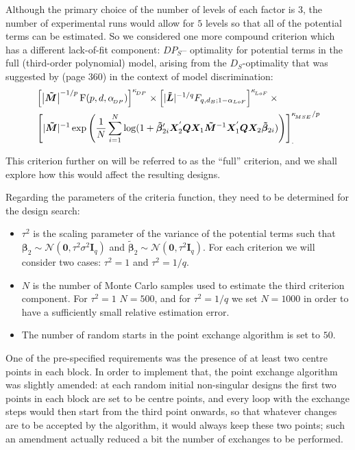 Although the primary choice of the number of levels of each factor is $3$, the number of experimental runs would allow for $5$ levels so that all of the potential terms can be estimated. So we considered one more compound criterion which has a different lack-of-fit component: $DP_S$-- optimality for potential terms in the full (third-order polynomial) model, arising from the $D_S$-optimality that was suggested by \cite{Atkinson2007} (page $360$) in the context of model discrimination:
\begin{align}
\label{eq::crit2}
&\left[\left|\bm{\tilde{M}}\right|^{-1/p}\mathrm{F}(p,d,\alpha_{\!_{DP}})\right]^{\kappa_{\!_{DP}}} \times  \left[|\bm{\tilde{L}}|^{-1/q}F_{q,d_B;1-\alpha_{LoF}}\right]^{\kappa_{\!_{LoF}}}\times \notag\\ & \left[|\bm{\tilde{M}}|^{-1}\exp\left(\frac{1}{N}\sum_{i=1}^{N}\log(1+\bm{\tilde{\beta}}_{2i}'\bm{X}_2^{'}\bm{Q}\bm{X}_1\bm{\tilde{M}}^{-1}\bm{X}_1^{'}\bm{Q}\bm{X}_2\bm{\tilde{\beta}}_{2i})\right)\right]_{.}^{\kappa_{\!_{MSE}}/p}
\end{align}

This criterion further on will be referred to as the ``full'' criterion, and we shall explore how this would affect the resulting designs.

Regarding the parameters of the criteria function, they need to be determined for the design search:
\begin{itemize}
\item $\tau^2$ is the scaling parameter of the variance of the potential terms such that $\bm{\beta}_2\sim \mathcal{N}(\bm{0},\tau^{2}\sigma^{2}\bm{I}_{q})$ and $\bm{\tilde{\beta}}_2\sim \mathcal{N}(\bm{0},\tau^{2}\bm{I}_{q})$. For each criterion we will consider two cases: $\tau^2=1$ and $\tau^2=1/q$. 
\item $N$ is the number of Monte Carlo samples used to estimate the third criterion component. For $\tau^2=1$ $N=500$, and for $\tau^2=1/q$ we set $N=1000$ in order to have a sufficiently small relative estimation error.
\item The number of random starts in the point exchange algorithm is set to $50$.  
\end{itemize}

One of the pre-specified requirements was the presence of at least two centre points in each block. In order to implement that, the point exchange algorithm was slightly amended: at each random initial non-singular designs the first two points in each block are set to be centre points, and every loop with the exchange steps would then start from the third point onwards, so that whatever changes are to be accepted by the algorithm, it would always keep these two points; such an amendment  actually reduced a bit the number of exchanges to be performed. 

